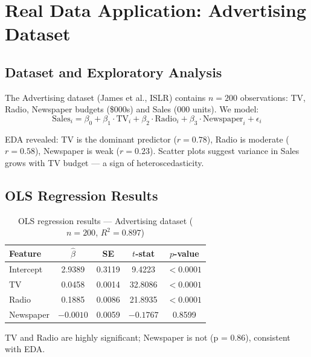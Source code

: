\documentclass[12pt,a4paper]{article}
\begin{document}
\section{Real Data Application: Advertising Dataset}

\subsection{Dataset and Exploratory Analysis}

The Advertising dataset (James et al., ISLR) contains $n = 200$ observations:
TV, Radio, Newspaper budgets (\$000s) and Sales (000 units). We model:
\begin{equation}
    \text{Sales}_i = \beta_0 + \beta_1\cdot\text{TV}_i + \beta_2\cdot\text{Radio}_i
    + \beta_3\cdot\text{Newspaper}_i + \epsilon_i
\end{equation}

EDA revealed: TV is the dominant predictor ($r = 0.78$), Radio is moderate
($r = 0.58$), Newspaper is weak ($r = 0.23$). Scatter plots suggest
variance in Sales grows with TV budget --- a sign of heteroscedasticity.

\subsection{OLS Regression Results}

\begin{table}[H]
\centering
\caption{OLS regression results --- Advertising dataset ($n = 200$, $R^2 = 0.897$)}
\label{tab:ols_real}
\begin{tabular}{lcccc}
\toprule
\textbf{Feature} & $\hat{\beta}$ & \textbf{SE} & $t$\textbf{-stat} & $p$\textbf{-value} \\
\midrule
Intercept  & 2.9389 & 0.3119 &  9.4223 & $< 0.0001$ \\
TV         & 0.0458 & 0.0014 & 32.8086 & $< 0.0001$ \\
Radio      & 0.1885 & 0.0086 & 21.8935 & $< 0.0001$ \\
Newspaper  & $-0.0010$ & 0.0059 & $-0.1767$ & 0.8599 \\
\bottomrule
\end{tabular}
\end{table}

TV and Radio are highly significant; Newspaper is not (p = 0.86), consistent
with EDA.
\end{document}
